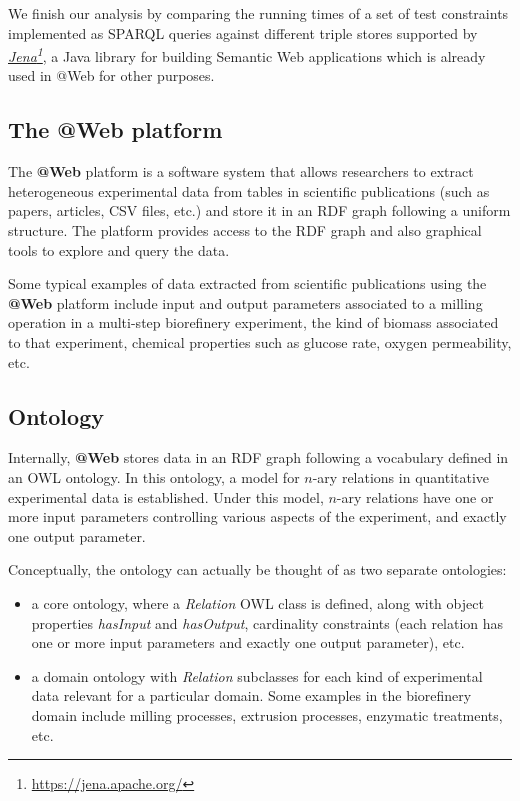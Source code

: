 \documentclass[a4paper, 10pt]{article}
\makeatletter
\newcommand{\atweb}{\textbf{@Web}\xspace}
\newcommand{\nary}{$n$-ary\xspace}
\newcommand{\fnhref}[2]{\href{#2}{#1}\footnote{\url{#2}}}
\newcommand{\ifnhref}[2]{\textit{\fnhref{#1}{#2}}}
\makeatother
\begin{document}
We finish our analysis by comparing the running times of a set of test
constraints implemented as SPARQL queries against different triple stores
supported by \ifnhref{Jena}{https://jena.apache.org/}, a Java library for
building Semantic Web applications which is already used in @Web for other
purposes.


\subsection{The \atweb platform}

The \atweb platform is a software system that allows researchers to extract
heterogeneous experimental data from tables in scientific publications (such as
papers, articles, CSV files, etc.) and store it in an RDF graph following a
uniform structure. The platform provides access to the RDF graph and also
graphical tools to explore and query the data.

Some typical examples of data extracted from scientific publications using the \atweb platform include input and output parameters associated to a
milling operation in a multi-step biorefinery experiment, the kind of biomass
associated to that experiment, chemical properties such as glucose rate, oxygen permeability, etc.


\subsection{Ontology}
\label{sec:ontology}

Internally, \atweb stores data in an RDF graph following a vocabulary defined
in an OWL ontology. In this ontology, a model for \nary relations in
quantitative experimental data is established. Under this model, \nary
relations have one or more input parameters controlling various aspects of the
experiment, and exactly one output parameter.

Conceptually, the ontology can actually be thought of as two separate
ontologies:

\begin{itemize}
  \item a core ontology, where a \textit{Relation} OWL class is defined, along
    with object properties \textit{hasInput} and \textit{hasOutput},
    cardinality constraints (each relation has one or more input parameters and
    exactly one output parameter), etc.

  \item a domain ontology with \textit{Relation} subclasses for each kind of
    experimental data relevant for a particular domain. Some examples in the
    biorefinery domain include milling processes, extrusion processes,
    enzymatic treatments, etc.
\end{itemize}
\end{document}

